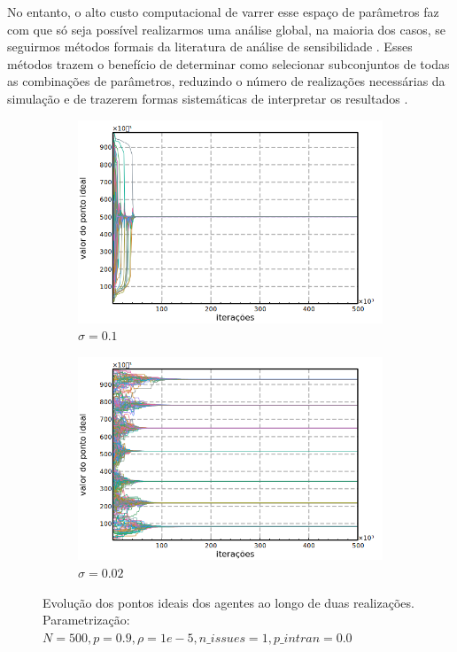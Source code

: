 No entanto, o alto custo computacional de varrer esse espaço de parâmetros faz com
que só seja possível realizarmos uma análise global, na maioria dos casos, se
seguirmos métodos formais da literatura de análise de sensibilidade
\cite{railsback2012agent}. Esses métodos trazem o benefício de determinar como
selecionar subconjuntos de todas as combinações de parâmetros, reduzindo o
número de realizações necessárias da simulação e de trazerem formas sistemáticas
de interpretar os resultados \cite{railsback2012agent}.


\begin{figure}[h]
    \centering
    \begin{subfigure}[b]{0.49\textwidth}
      \includegraphics[width=\textwidth]{ims/timeseries1.png}
      \caption{\( \sigma = 0.1\) }
    \end{subfigure}
    \begin{subfigure}[b]{0.49\textwidth}
      \includegraphics[width=\textwidth]{ims/timeseries2.png}
       \caption{\(\sigma = 0.02\) }
      \end{subfigure}
      \caption{Evolução dos pontos ideais dos agentes ao longo de duas realizações.
        Parametrização: \(  N = 500, p = 0.9, \rho =  1e-5, n\_issues = 1 , p\_intra
        n= 0.0 \)}
      \label{fig:tseries1}
    \end{figure}
    
